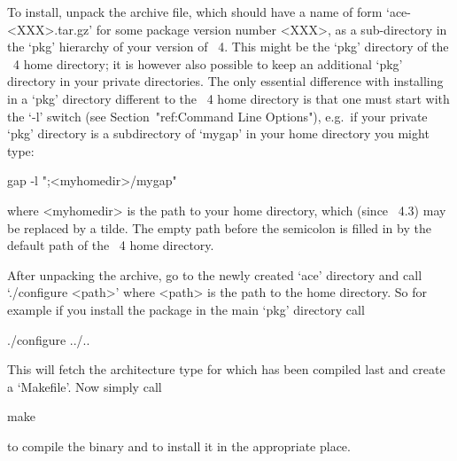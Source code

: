 


To install, unpack the archive file, which should have a name of  form
`ace-<XXX>.tar.gz'  for  some  package  version  number   <XXX>, as  a
sub-directory in the `pkg' hierarchy of your version of {\GAP}~4. This
might be the `pkg' directory of the {\GAP}~4  home  directory;  it  is
however also possible to keep an additional `pkg'  directory  in  your
private directories. The only  essential  difference  with  installing
{\ACE} in a `pkg' directory different to the {\GAP}~4  home  directory
is  that  one  must  start  {\GAP}   with   the   `-l'   switch   (see
Section~"ref:Command  Line  Options"),  e.g.~if  your  private   `pkg'
directory is a subdirectory of `mygap'  in  your  home  directory  you
might type:

gap -l ";<myhomedir>/mygap"

where <myhomedir> is the path to your  home  directory,  which  (since
{\GAP}~4.3) may be replaced by a tilde.  The  empty  path  before  the
semicolon is filled in by  the  default  path  of  the  {\GAP}~4  home
directory.

After unpacking the archive, go to the newly created  `ace'  directory
and call `./configure <path>' where <path> is the path to  the  {\GAP}
home directory. So for example if you install the package in the  main
`pkg' directory call

\begintt
./configure ../..
\endtt

This  will fetch  the  architecture  type for  which  {\GAP} has  been
compiled last and create a `Makefile'. Now simply call

\begintt
make
\endtt

to compile the binary and to install it in the appropriate place.

